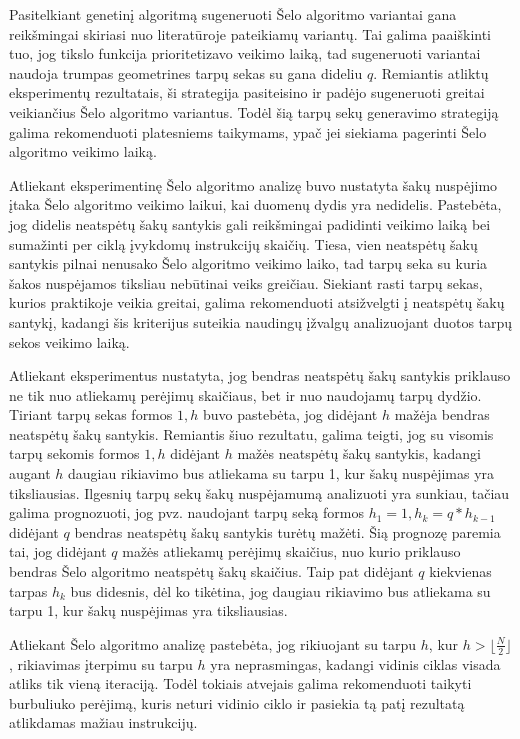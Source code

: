 \documentclass{VUMIFInfBakalaurinis}
\begin{document}
Pasitelkiant genetinį algoritmą sugeneruoti Šelo algoritmo variantai gana reikšmingai skiriasi nuo literatūroje pateikiamų variantų.
Tai galima paaiškinti tuo, jog tikslo funkcija prioritetizavo veikimo laiką, tad sugeneruoti variantai naudoja trumpas geometrines tarpų sekas su gana dideliu $q$.
Remiantis atliktų eksperimentų rezultatais, ši strategija pasiteisino ir padėjo sugeneruoti greitai veikiančius Šelo algoritmo variantus.
Todėl šią tarpų sekų generavimo strategiją galima rekomenduoti platesniems taikymams, ypač jei siekiama pagerinti Šelo algoritmo veikimo laiką.

Atliekant eksperimentinę Šelo algoritmo analizę buvo nustatyta šakų nuspėjimo įtaka Šelo algoritmo veikimo laikui, kai duomenų dydis yra nedidelis.
Pastebėta, jog didelis neatspėtų šakų santykis gali reikšmingai padidinti veikimo laiką bei sumažinti per ciklą įvykdomų instrukcijų skaičių.
Tiesa, vien neatspėtų šakų santykis pilnai nenusako Šelo algoritmo veikimo laiko, tad tarpų seka su kuria šakos nuspėjamos tiksliau nebūtinai veiks greičiau.
Siekiant rasti tarpų sekas, kurios praktikoje veikia greitai, galima rekomenduoti atsižvelgti į neatspėtų šakų santykį,
kadangi šis kriterijus suteikia naudingų įžvalgų analizuojant duotos tarpų sekos veikimo laiką.

Atliekant eksperimentus nustatyta, jog bendras neatspėtų šakų santykis priklauso ne tik nuo atliekamų perėjimų skaičiaus, bet ir nuo naudojamų tarpų dydžio.
Tiriant tarpų sekas formos $1, h$ buvo pastebėta, jog didėjant $h$ mažėja bendras neatspėtų šakų santykis.
Remiantis šiuo rezultatu, galima teigti, jog su visomis tarpų sekomis formos $1, h$ didėjant $h$ mažės neatspėtų šakų santykis,
kadangi augant $h$ daugiau rikiavimo bus atliekama su tarpu 1, kur šakų nuspėjimas yra tiksliausias.
Ilgesnių tarpų sekų šakų nuspėjamumą analizuoti yra sunkiau, tačiau galima prognozuoti, jog pvz. naudojant tarpų seką formos $h_1 = 1, h_k = q * h_{k-1}$
didėjant $q$ bendras neatspėtų šakų santykis turėtų mažėti.
Šią prognozę paremia tai, jog didėjant $q$ mažės atliekamų perėjimų skaičius, nuo kurio priklauso bendras Šelo algoritmo neatspėtų šakų skaičius.
Taip pat didėjant $q$ kiekvienas tarpas $h_k$ bus didesnis, dėl ko tikėtina, jog daugiau rikiavimo bus atliekama su tarpu 1, kur šakų nuspėjimas yra tiksliausias.

Atliekant Šelo algoritmo analizę pastebėta, jog rikiuojant su tarpu $h$, kur $h > \lfloor\frac{N}{2}\rfloor$,
rikiavimas įterpimu su tarpu $h$ yra neprasmingas, kadangi vidinis ciklas visada atliks tik vieną iteraciją.
Todėl tokiais atvejais galima rekomenduoti taikyti burbuliuko perėjimą, kuris neturi vidinio ciklo ir pasiekia tą patį rezultatą
atlikdamas mažiau instrukcijų.
\end{document}
